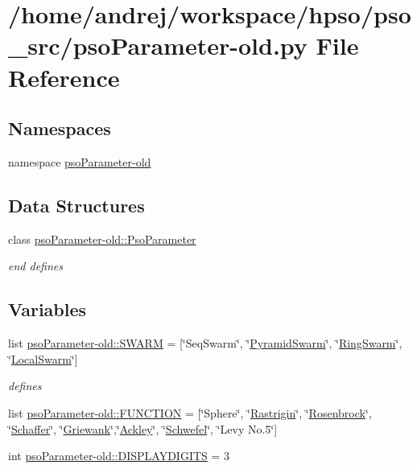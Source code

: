 \hypertarget{psoParameter-old_8py}{
\section{/home/andrej/workspace/hpso/pso\_\-src/psoParameter-old.py File Reference}
\label{psoParameter-old_8py}
}
\subsection*{Namespaces}
\begin{CompactItemize}
\item 
namespace \hyperlink{namespacepsoParameter-old}{psoParameter-old}
\end{CompactItemize}
\subsection*{Data Structures}
\begin{CompactItemize}
\item 
class \hyperlink{classpsoParameter-old_1_1PsoParameter}{psoParameter-old::PsoParameter}
\begin{CompactList}\small\item\em end defines \item\end{CompactList}\end{CompactItemize}
\subsection*{Variables}
\begin{CompactItemize}
\item 
list \hyperlink{namespacepsoParameter-old_83f59ee3e05ee716f197192f202ede38}{psoParameter-old::SWARM} = \mbox{[}\char`\"{}SeqSwarm\char`\"{}, \char`\"{}\hyperlink{classPyramidSwarm}{PyramidSwarm}\char`\"{}, \char`\"{}\hyperlink{classRingSwarm}{RingSwarm}\char`\"{}, \char`\"{}\hyperlink{classLocalSwarm}{LocalSwarm}\char`\"{}\mbox{]}
\begin{CompactList}\small\item\em defines \item\end{CompactList}\item 
list \hyperlink{namespacepsoParameter-old_7c1abf2505a232031f1de65e28db72a1}{psoParameter-old::FUNCTION} = \mbox{[}\char`\"{}Sphere\char`\"{}, \char`\"{}\hyperlink{classRastrigin}{Rastrigin}\char`\"{}, \char`\"{}\hyperlink{classRosenbrock}{Rosenbrock}\char`\"{}, \char`\"{}\hyperlink{classSchaffer}{Schaffer}\char`\"{}, \char`\"{}\hyperlink{classGriewank}{Griewank}\char`\"{},\char`\"{}\hyperlink{classAckley}{Ackley}\char`\"{}, \char`\"{}\hyperlink{classSchwefel}{Schwefel}\char`\"{}, \char`\"{}Levy No.5\char`\"{}\mbox{]}
\item 
int \hyperlink{namespacepsoParameter-old_7c0ee668254cbad1c14422525b87d033}{psoParameter-old::DISPLAYDIGITS} = 3
\end{CompactItemize}
